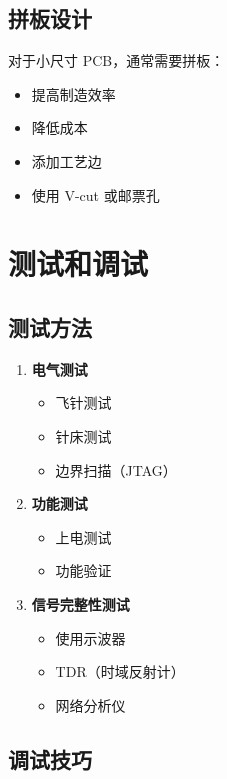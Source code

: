 \subsection{拼板设计}

对于小尺寸 PCB，通常需要拼板：

\begin{itemize}
  \item 提高制造效率
  \item 降低成本
  \item 添加工艺边
  \item 使用 V-cut 或邮票孔
\end{itemize}

\section{测试和调试}

\subsection{测试方法}

\begin{enumerate}
  \item \textbf{电气测试}
    \begin{itemize}
      \item 飞针测试
      \item 针床测试
      \item 边界扫描（JTAG）
    \end{itemize}

  \item \textbf{功能测试}
    \begin{itemize}
      \item 上电测试
      \item 功能验证
    \end{itemize}

  \item \textbf{信号完整性测试}
    \begin{itemize}
      \item 使用示波器
      \item TDR（时域反射计）
      \item 网络分析仪
    \end{itemize}
\end{enumerate}

\subsection{调试技巧}

